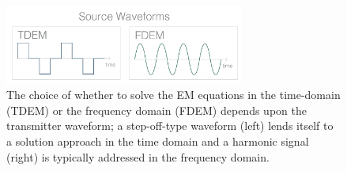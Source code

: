 \begin{figure}
    \begin{center}
    \includegraphics[width=0.7\textwidth]{figures/intro/waveforms.png}
    \end{center}
\caption{
    The choice of whether to solve the EM equations in the time-domain (TDEM) or the frequency domain (FDEM) depends upon the transmitter waveform; a step-off-type waveform (left) lends itself to a solution approach in the time domain and a harmonic signal (right) is typically addressed in the frequency domain.
}
\label{fig:waveforms}
\end{figure}
